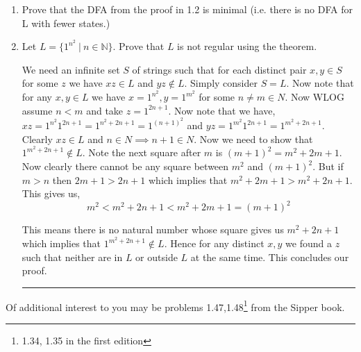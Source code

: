 \documentclass[11pt]{article}
\newenvironment{proof}{{\bf Proof:}}{\hfill\rule{2mm}{2mm}}
\begin{document}
\begin{enumerate}
    \begin{proof}
      We have the equivalence relation $\sim L$ on $\Sigma^{*}$. Now consider the following partition $[0], \dots, [n - 1]$ where for a string $x = 1^{a} \in \Sigma^{*}$ we have $x \in [k] \iff a \equiv k \pmod n$. Now note that we have $\Sigma^{*} = [0] \cup \dots \cup [n - 1]$ as for any strings $1^{k}$ we have some $j \in \{0, \dots, n - 1\}$ for which $k \equiv j \pmod n$ hence $1^{k} \in [j]$ uniquely. So we need to two elements in an equivalence class are equivalent. Consider for any $0 \le j \le n-1$ the class $[j]$ note that if $x = 1^{a}, y = 1^{b} \in [j]$ then we have $a \equiv j \pmod n$ and $b \equiv j \pmod n$. So note that for any string $z  = 1^{d}$ we have $xz \in L \implies 1^{a + d} \in L \implies a + d \equiv c \pmod n \implies b+ d \equiv c \pmod n \implies yz \in L$ similarly if $xz \not \in L$ we have $a + d \not \equiv c \pmod n \implies b + d \not \equiv c \pmod n$ whcih means $yz \not \in L$. Hence we show that $x \sim L y$. So we have paritioned our set $\Sigma^{*}$ under the relation $\sim L$ into a finite number of equivalence classes.

    \end{proof}
    
    \item Prove that the DFA from the proof in 1.2 is minimal (i.e. there is no DFA for L with fewer states.)
    
    \item Let $L = \{1^{n^2} ~|~ n \in \mathbb{N}\}$. Prove that $L$ is not regular using the theorem. 

      \begin{proof}
        We need an infinite set $S$ of strings such that for each distinct pair $x, y \in S$ for some $z$ we have $xz \in L$ and $yz \not \in L$. Simply consider $S = L$. Now note that for any $x, y \in L$ we have $x = 1^{n^2}, y= 1^{m^2}$  for some $n \ne m \in N$. Now WLOG assume $n < m$ and take $z = 1^{2n + 1}$. Now note that we have, $xz = 1^{n^2} 1^{2n + 1} = 1^{n^2 + 2n + 1} = 1^{(n + 1)^2}$ and $yz = 1^{m^2}1^{2n + 1} = 1^{m^2 + 2n + 1}$. Clearly $xz \in L$ and $n \in N \implies n + 1 \in N$. Now we need to show that $1^{m^2 + 2n + 1 } \not \in L$. Note the next square after $m$ is $(m + 1)^2 = m^2 + 2m + 1$. Now clearly there cannot be any square between $m^2$ and $(m + 1)^2$. But if $m > n$ then $2m + 1 > 2n + 1$ which implies that $m^2 + 2m + 1 > m^2 + 2n + 1$. This gives us, 
        \[
          m^2 < m^2 + 2n + 1 < m^2 + 2m + 1 = (m + 1)^2
        \]

        This means there is no natural number whose square gives us $m^2 + 2n + 1$ which implies that $1^{m^2 + 2n + 1} \not \in L$. Hence for any distinct $x, y$ we found a $z$ such that neither are in $L$ or outside $L$ at the same time. This concludes our proof.
      \end{proof}
\end{enumerate}

Of additional interest to you may be problems 1.47,1.48\footnote{1.34, 1.35 in the first edition} from the Sipper book. 
\end{document}

